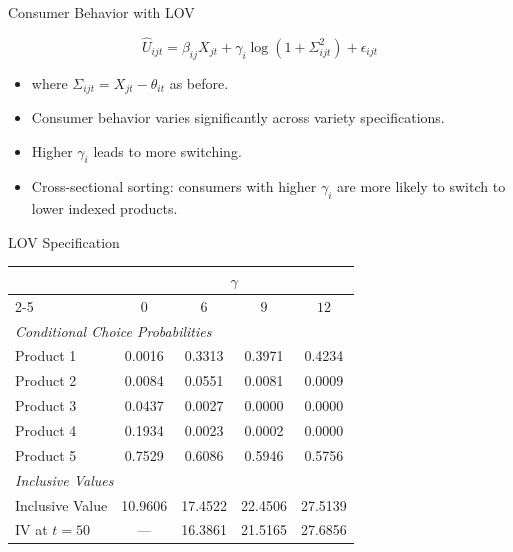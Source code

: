 \documentclass[aspectratio=169,professionalfonts]{beamer}
\begin{document}
\begin{frame}{Consumer Behavior with LOV}
  \begin{tcolorbox}[colback=red!5!white, colframe=UGARed, title=\textbf{Utility Function with LOV}]
    \begin{equation*}
      \hat{U}_{ijt} = \beta_{ij} X_{jt} + \gamma_i \log(1 + \Sigma_{ijt}^2) + \epsilon_{ijt}
    \end{equation*}
  \end{tcolorbox}
  \begin{itemize}
    \item where $\Sigma_{ijt} = X_{jt} - \theta_{it}$ as before.
    \item Consumer behavior varies significantly across variety specifications.
    \item Higher $\gamma_i$ leads to more switching.
    \item Cross-sectional sorting: consumers with higher $\gamma_i$ are more likely to switch to lower indexed products.
  \end{itemize}
\end{frame}

\begin{frame}{LOV Specification}
  \begin{center}
  \scriptsize
  \begin{tabular}{lcccc}
    \toprule
    & \multicolumn{4}{c}{$\gamma$} \\
    \cmidrule(lr){2-5}
    & $0$ & $6$ & $9$ & $12$ \\
    \midrule
    \multicolumn{5}{l}{\textit{Conditional Choice Probabilities}} \\[2pt]
    Product 1 & 0.0016 & 0.3313 & 0.3971 & 0.4234 \\
    Product 2 & 0.0084 & 0.0551 & 0.0081 & 0.0009 \\
    Product 3 & 0.0437 & 0.0027 & 0.0000 & 0.0000 \\
    Product 4 & 0.1934 & 0.0023 & 0.0002 & 0.0000 \\
    Product 5 & 0.7529 & 0.6086 & 0.5946 & 0.5756 \\
    \midrule
    \multicolumn{5}{l}{\textit{Inclusive Values}} \\[2pt]
    Inclusive Value & 10.9606 & 17.4522 & 22.4506 & 27.5139 \\
    IV at $t=50$    & ---     & 16.3861 & 21.5165 & 27.6856 \\
    \bottomrule
  \end{tabular}
  \end{center}
\end{frame}
\end{document}
